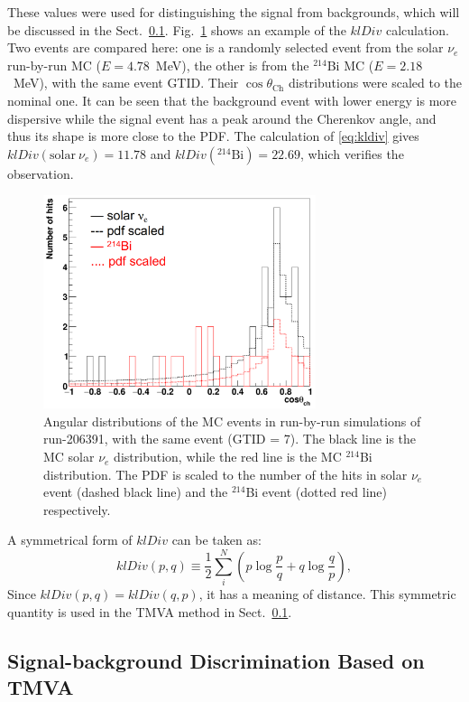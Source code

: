 These values were used for distinguishing the signal from backgrounds, which will be discussed in the Sect.~\ref{sect:tmva}. Fig.~\ref{kLdiv_example} shows an example of the $klDiv$ calculation. Two events are compared here: one is a randomly selected event from the solar $\nu_e$ run-by-run MC ($E=4.78$~MeV), the other is from the $^{214}$Bi MC ($E=2.18$~MeV), with the same event GTID. Their $\cos\theta_\mathrm{Ch}$ distributions were scaled to the nominal one. It can be seen that the background event with lower energy is more dispersive while the signal event has a peak around the Cherenkov angle, and thus its shape is more close to the PDF. The calculation of \ref{eq:kldiv} gives $klDiv(\mathrm{solar}~\nu_e)=11.78$ and $klDiv(^{214}\mathrm{Bi})=22.69$, which verifies the observation.

\begin{figure}[!htb]
	\centering
	\includegraphics[width=8cm]{klDiv_example.png}
	\caption[Angular distributions of the MC events in run-by-run simulations.]{Angular distributions of the MC events in run-by-run simulations of run-206391, with the same event (GTID = 7). The black line is the MC solar $\nu_e$ distribution, while the red line is the MC $^{214}$Bi distribution. The PDF is scaled to the number of the hits in solar $\nu_e$ event (dashed black line) and the $^{214}$Bi event (dotted red line) respectively.	\label{kLdiv_example}}
\end{figure}

A symmetrical form of $klDiv$ can be taken as:
\begin{equation}\label{eq:symKlDiv}
klDiv(p,q) \equiv \frac{1}{2}\sum_{i}^N (p\log{\frac{p}{q}}+q\log{\frac{q}{p}}),
\end{equation}
Since $klDiv(p,q)=klDiv(q,p)$, it has a meaning of distance. This symmetric quantity is used in the TMVA method in Sect.~\ref{sect:tmva}.

\subsection{Signal-background Discrimination Based on TMVA}\label{sect:tmva}

